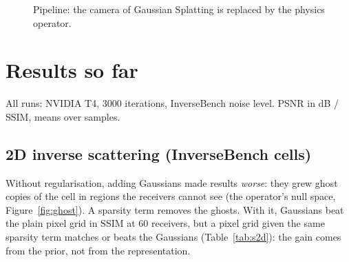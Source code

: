 \documentclass[11pt,a4paper]{article}
\newcommand{\vect}[1]{\bm{#1}}
\begin{document}
\begin{figure}[H]
\centering
{}
\caption{Pipeline: the camera of Gaussian Splatting is replaced by the physics operator.}
\label{fig:pipeline}
\end{figure}

\section{Results so far}
All runs: NVIDIA T4, 3000 iterations, InverseBench noise level. PSNR in dB / SSIM, means over samples.

\subsection{2D inverse scattering (InverseBench cells)}
Without regularisation, adding Gaussians made results \emph{worse}: they grew ghost copies of the cell in regions the
receivers cannot see (the operator's null space, Figure~\ref{fig:ghost}). A sparsity term removes the ghosts. With
it, Gaussians beat the plain pixel grid in SSIM at 60 receivers, but a pixel grid given the same sparsity term
matches or beats the Gaussians (Table~\ref{tab:s2d}): the gain comes from the prior, not from the representation.
\end{document}
